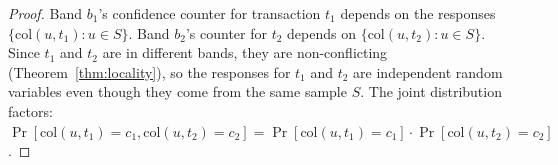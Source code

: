 \begin{proof}
Band $b_1$'s confidence counter for transaction $t_1$ depends on the responses
$\{\text{col}(u, t_1) : u \in S\}$. Band $b_2$'s counter for $t_2$ depends on
$\{\text{col}(u, t_2) : u \in S\}$. Since $t_1$ and $t_2$ are in different bands,
they are non-conflicting (Theorem~\ref{thm:locality}), so the responses for $t_1$ and
$t_2$ are independent random variables even though they come from the same sample $S$.
The joint distribution factors: $\Pr[\text{col}(u, t_1) = c_1, \text{col}(u, t_2) = c_2] =
\Pr[\text{col}(u, t_1) = c_1] \cdot \Pr[\text{col}(u, t_2) = c_2]$.
\end{proof}


